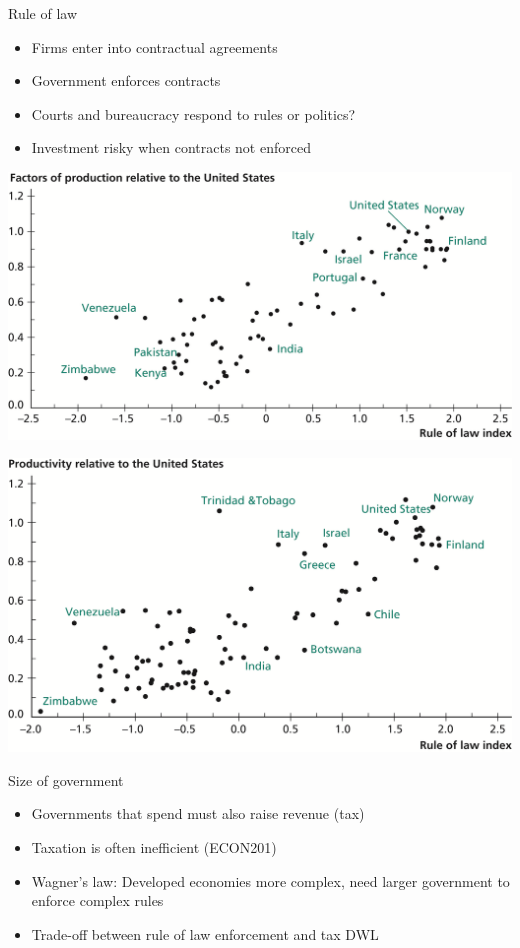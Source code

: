 \documentclass[10pt]{beamer}
\begin{document}
\begin{frame}[label={sec:orgc06a5b8}]{}
\alert{Rule of law}
\begin{itemize}
\item Firms enter into contractual agreements
\item Government enforces contracts
\item Courts and bureaucracy respond to rules or politics?
\item Investment risky when contracts not enforced
\end{itemize}
\end{frame}

\begin{frame}[label={sec:org0af4b91}]{}
\begin{center}
\includegraphics[width=.75\textwidth]{./img/12.1.png}
\end{center}
\end{frame}

\begin{frame}[label={sec:org7139d94}]{}
\begin{center}
\includegraphics[width=.75\textwidth]{./img/12.2.png}
\end{center}
\end{frame}

\begin{frame}[label={sec:org01685ca}]{}
\alert{Size of government}
\begin{itemize}
\item Governments that spend must also raise revenue (tax)
\item Taxation is often inefficient (ECON201)
\item Wagner's law: Developed economies more complex, need larger government to enforce complex rules
\item Trade-off between rule of law enforcement and tax DWL
\end{itemize}
\end{frame}
\end{document}
